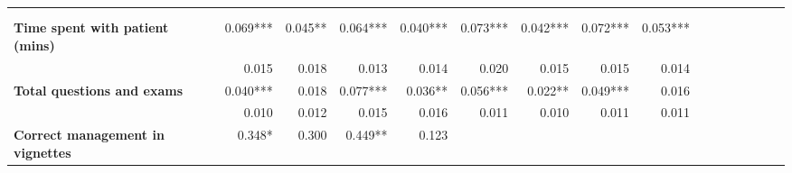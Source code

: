 \begin{tabular}{@{\extracolsep{5pt}}lrrrrrrrrrrrrrrr}
\toprule
&  &  &  &  &  &  &  &  \\
{\bf } &  &  &  &  &  &  &  &  \\
\hline
{\bf Time spent with patient (mins)} & 0.069*** & 0.045**\phantom{*} & 0.064*** & 0.040*** & 0.073*** & 0.042*** & 0.072*** & 0.053*** \\
{\bf } & 0.015\phantom{***} & 0.018\phantom{***} & 0.013\phantom{***} & 0.014\phantom{***} & 0.020\phantom{***} & 0.015\phantom{***} & 0.015\phantom{***} & 0.014\phantom{***} \\
{\bf Total questions and exams} & 0.040*** & 0.018\phantom{***} & 0.077*** & 0.036**\phantom{*} & 0.056*** & 0.022**\phantom{*} & 0.049*** & 0.016\phantom{***} \\
{\bf } & 0.010\phantom{***} & 0.012\phantom{***} & 0.015\phantom{***} & 0.016\phantom{***} & 0.011\phantom{***} & 0.010\phantom{***} & 0.011\phantom{***} & 0.011\phantom{***} \\
{\bf Correct management in vignettes} & 0.348*\phantom{**} & 0.300\phantom{***} & 0.449**\phantom{*} & 0.123\phantom{***} & \phantom{***} & \phantom{***} & \phantom{***} & \phantom{***} \\

\end{tabular}

